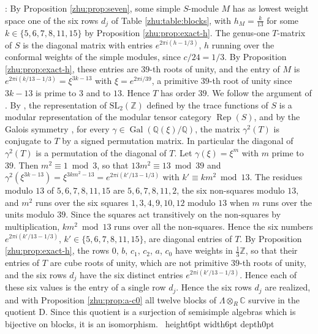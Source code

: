 \documentclass[leqno]{article}
\newcommand{\Cbb}{\ensuremath{\mathbb{C}}}
\newcommand{\D}{\mathrm{D}}
\newcommand{\Z}{\ensuremath{\mathbb{Z}}}
\newcommand{\qed}{\hfill \vrule height6pt  width6pt depth0pt}
\newcommand{\ot}{\otimes}
\DeclareMathOperator{\Rep}{Rep}
\newenvironment{proof}[1][]{\noindent {\it Proof #1} : }{\hbox{~}\qed
\smallskip
}
\numberwithin{equation}{section}
\begin{document}
\begin{proof}
By Proposition \ref{zhu:prop:seven}, some simple $S$-module $M$ has as lowest weight space one of the six rows $d_j$ of Table \ref{zhu:table:blocks}, with $h_M = \frac{k}{13}$ for some $k \in \{5,6,7,8,11,15\}$ by Proposition \ref{zhu:prop:exact-h}. The genus-one $T$-matrix of $S$ is the diagonal matrix with entries $e^{2\pi i(h - 1/3)}$, $h$ running over the conformal weights of the simple modules, since $c/24 = 1/3$. By Proposition \ref{zhu:prop:exact-h}, these entries are $39$-th roots of unity, and the entry of $M$ is $e^{2\pi i(k/13 - 1/3)} = \xi^{3k - 13}$ with $\xi = e^{2\pi i/39}$, a primitive $39$-th root of unity since $3k - 13$ is prime to $3$ and to $13$. Hence $T$ has order $39$. We follow the argument of \cite[Section 11.5 p.~62]{Rie26b}. By \cite[Theorem 3.10 p.~2142]{DLN15}, the representation of $\mathrm{SL}_2(\Z)$ defined by the trace functions of $S$ is a modular representation of the modular tensor category $\Rep(S)$, and by the Galois symmetry \cite[Theorem II p.~2124]{DLN15}, for every $\gamma \in \operatorname{Gal}(\mathbb{Q}(\xi)/\mathbb{Q})$, the matrix $\gamma^2(T)$ is conjugate to $T$ by a signed permutation matrix. In particular the diagonal of $\gamma^2(T)$ is a permutation of the diagonal of $T$. Let $\gamma(\xi) = \xi^m$ with $m$ prime to $39$. Then $m^2 \equiv 1 \bmod 3$, so that $13 m^2 \equiv 13 \bmod 39$ and $\gamma^2(\xi^{3k-13}) = \xi^{3k m^2 - 13} = e^{2\pi i(k'/13 - 1/3)}$ with $k' \equiv k m^2 \bmod 13$. The residues modulo $13$ of $5, 6, 7, 8, 11, 15$ are $5, 6, 7, 8, 11, 2$, the six non-squares modulo $13$, and $m^2$ runs over the six squares $1, 3, 4, 9, 10, 12$ modulo $13$ when $m$ runs over the units modulo $39$. Since the squares act transitively on the non-squares by multiplication, $k m^2 \bmod 13$ runs over all the non-squares. Hence the six numbers $e^{2\pi i(k'/13 - 1/3)}$, $k' \in \{5,6,7,8,11,15\}$, are diagonal entries of $T$. By Proposition \ref{zhu:prop:exact-h}, the rows $0$, $b$, $c_1$, $c_2$, $a$, $c_0$ have weights in $\frac13\Z$, so that their entries of $T$ are cube roots of unity, which are not primitive $39$-th roots of unity, and the six rows $d_j$ have the six distinct entries $e^{2\pi i(k'/13 - 1/3)}$. Hence each of these six values is the entry of a single row $d_j$. Hence the six rows $d_j$ are realized, and with Proposition \ref{zhu:prop:a-c0} all twelve blocks of $\Lambda \ot_R \Cbb$ survive in the quotient $\D$. Since this quotient is a surjection of semisimple algebras which is bijective on blocks, it is an isomorphism.
\end{proof}
\end{document}
